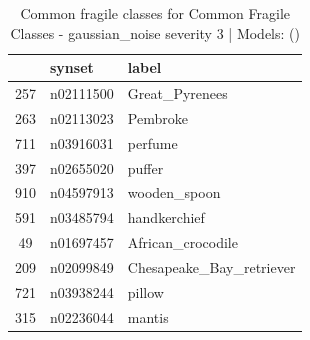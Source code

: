 \begin{table}
\caption{Common fragile classes for Common Fragile Classes - gaussian_noise severity 3 | Models: ()}
\label{tab:Common Fragile Classes - gaussian_noise severity 3_d41d8cd9}
\begin{tabular}{cll}
\toprule
 & synset & label \\
\midrule
257 & n02111500 & Great_Pyrenees \\
263 & n02113023 & Pembroke \\
711 & n03916031 & perfume \\
397 & n02655020 & puffer \\
910 & n04597913 & wooden_spoon \\
591 & n03485794 & handkerchief \\
49 & n01697457 & African_crocodile \\
209 & n02099849 & Chesapeake_Bay_retriever \\
721 & n03938244 & pillow \\
315 & n02236044 & mantis \\
\bottomrule
\end{tabular}
\end{table}
